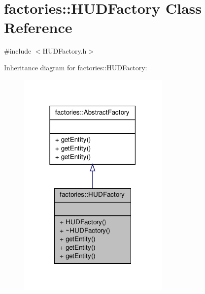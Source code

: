 \hypertarget{classfactories_1_1HUDFactory}{\section{factories\-:\-:\-H\-U\-D\-Factory \-Class \-Reference}
\label{d5/d6e/classfactories_1_1HUDFactory}
}


{\ttfamily \#include $<$\-H\-U\-D\-Factory.\-h$>$}



\-Inheritance diagram for factories\-:\-:\-H\-U\-D\-Factory\-:\nopagebreak
\begin{figure}[H]
\begin{center}
\leavevmode
\includegraphics[width=210pt]{d0/df4/classfactories_1_1HUDFactory__inherit__graph}
\end{center}
\end{figure}


